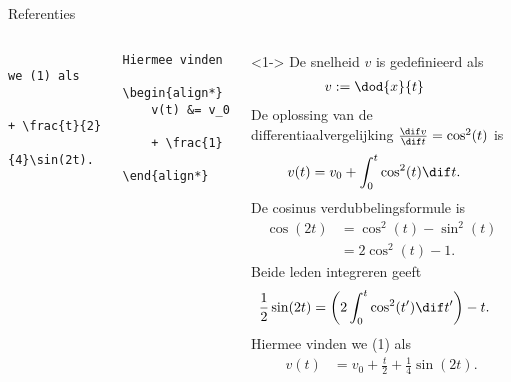 \begin{frame}[fragile,t]{Referenties}
\begin{columns}[t]
\begin{column}{0.5\textwidth}
\begin{verbatim}
                Hiermee vinden we (1) als
                \begin{align*}
                    v(t) &= v_0 + \frac{t}{2}
                    + \frac{1}{4}\sin(2t).
                \end{align*}
            \end{verbatim}
        \end{column}
        \begin{column}{0.5\textwidth}
            \begin{adjustbox}{frame=1pt 10pt,valign=t}%
                \begin{minipage}{\textwidth-22pt}
                    \begin{onlyenv}<1->%
                        {\tiny\setlength{\abovedisplayskip}{3pt}%
                            \setlength{\belowdisplayskip}{3pt}%
                            \setlength{\abovedisplayshortskip}{0pt}%
                            \setlength{\belowdisplayshortskip}{0pt}%
                            \setcounter{equation}{0}%
                            De snelheid $ v $ is gedefinieerd als
                            \begin{align}
                                v &:= \dod{x}{t}
                            \end{align}
                            De oplossing van de differentiaalvergelijking $ \frac{\dif v}{\dif t} = \cos^2(t) $ is
                            \begin{align}
                                v(t) & = v_0 + \int_{0}^{t}\cos^2(t)\dif t.
                            \end{align}
                            De cosinus verdubbelingsformule is
                            \begin{align*}
                                \cos(2t) & = \cos^2(t) - \sin^2(t) \\
                                         & = 2\cos^2(t)-1.
                            \end{align*}
                            Beide leden integreren geeft
                            \begin{align*}
                                \frac{1}{2}\sin(2t) & = \left(2\int_0^t\cos^2(t')\dif t'\right) - t.
                            \end{align*}
                            Hiermee vinden we (1) als
                            \begin{align*}
                                v(t) & = v_0 + \frac{t}{2} + \frac{1}{4}\sin(2t).
                            \end{align*}
                        }%
                    \end{onlyenv}%
                \end{minipage}
            \end{adjustbox}
        \end{column}
    \end{columns}
\end{frame}

